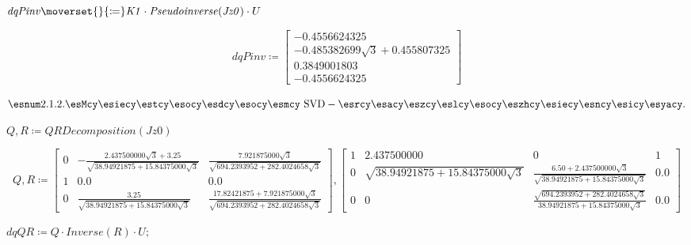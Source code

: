 \documentclass{article}
\begin{document}
\begin{Maple Normal}
{$ \displaystyle \mathit{dqPinv} {\moverset{}{\coloneqq}}\mathit{K1} \cdot \mathit{Pseudoinverse} (\mathit{Jz0})\cdot U  $}
\end{Maple Normal}
\begin{dmath}\label{(3)}
\mathit{dqPinv} \coloneqq \left[\begin{array}{c}
- 0.4556624325 
\\
 - 0.485382699 \sqrt{3}+ 0.455807325 
\\
  0.3849001803 
\\
 - 0.4556624325 
\end{array}\right]
\end{dmath}
\begin{Maple Normal}
{$ \displaystyle \esnum \mathrm{2}.\mathrm{1}.\mathrm{2}.\esMcy \esiecy \estcy \esocy \esdcy \esocy \esmcy \textrm{ SVD}-\esrcy \esacy \eszcy \eslcy \esocy \eszhcy \esiecy \esncy \esicy \esyacy . $}
\end{Maple Normal}
\begin{Maple Normal}
{$ \displaystyle Q ,R \coloneqq \mathit{QRDecomposition} (\mathit{Jz0}) $}
\end{Maple Normal}
\begin{dmath}\label{(4)}
Q ,R \coloneqq \left[\begin{array}{ccc}
0 & -\frac{ 2.437500000 \sqrt{3}+ 3.25}{\sqrt{ 38.94921875+ 15.84375000 \sqrt{3}}} & \frac{ 7.921875000 \sqrt{3}}{\sqrt{ 694.2393952+ 282.4024658 \sqrt{3}}} 
\\
 1 &  0.0 &  0.0 
\\
 0 & \frac{ 3.25}{\sqrt{ 38.94921875+ 15.84375000 \sqrt{3}}} & \frac{ 17.82421875+ 7.921875000 \sqrt{3}}{\sqrt{ 694.2393952+ 282.4024658 \sqrt{3}}} 
\end{array}\right],\left[\begin{array}{cccc}
1 &  2.437500000 & 0 & 1 
\\
 0 & \sqrt{ 38.94921875+ 15.84375000 \sqrt{3}} & \frac{ 6.50+ 2.437500000 \sqrt{3}}{\sqrt{ 38.94921875+ 15.84375000 \sqrt{3}}} &  0.0 
\\
 0 & 0 & \frac{\sqrt{ 694.2393952+ 282.4024658 \sqrt{3}}}{ 38.94921875+ 15.84375000 \sqrt{3}} &  0.0 
\end{array}\right]
\end{dmath}
\begin{Maple Normal}
{$ \displaystyle \mathit{dqQR} \coloneqq Q \cdot \mathit{Inverse} (R)\cdot U ; $}
\end{Maple Normal}
\end{document}
